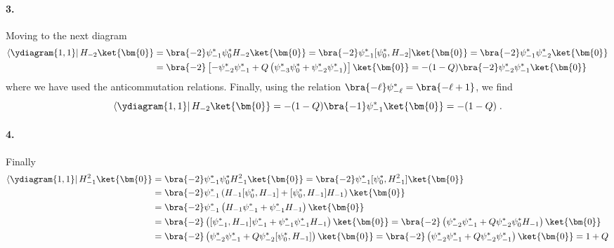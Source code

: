 \paragraph{3.} Moving to the next diagram
\begin{equation}
  \begin{split}
    \left\langle \ydiagram{1,1}\right| H_{-2} \ket{\bm{0}}
    & = \bra{-2} \psi_{-1}^\ast \psi_0^\ast H_{-2} \ket{\bm{0}} =
    \bra{-2} \psi_{-1}^\ast [\psi_0^\ast, H_{-2}] \ket{\bm{0}} =
    \bra{-2} \psi_{-1}^\ast \psi_{-2}^\ast\ket{\bm{0}}\\
    & = \bra{-2} \left[-\psi_{-2}^\ast \psi_{-1}^\ast
      + Q\left( \psi_{-3}^\ast \psi_0^\ast +
      \psi_{-2}^\ast \psi_{-1}^\ast \right)  \right]\ket{\bm{0}}
    = - (1 - Q) \bra{-2} \psi_{-2}^\ast \psi_{-1}^\ast \ket{\bm{0}}\\
  \end{split}
\end{equation}
where we have used the anticommutation relations. Finally, using the relation
\(\bra{-\ell} \psi_{-\ell}^\ast = \bra{-\ell + 1}\), we find
\begin{equation}
    \left\langle \ydiagram{1,1}\right| H_{-2} \ket{\bm{0}}
    = - (1 - Q) \bra{-1} \psi_{-1}^\ast \ket{\bm{0}} = - (1 - Q)\; .
\end{equation}


\paragraph{4.} Finally
\begin{equation}
\begin{split}
\left\langle \ydiagram{1,1}\right| H_{-1}^2 \ket{\bm{0}}
& = \bra{-2} \psi_{-1}^\ast \psi_0^\ast H_{-1}^2 \ket{\bm{0}} =
\bra{-2} \psi_{-1}^\ast [\psi_0^\ast, H_{-1}^2] \ket{\bm{0}} \\
& = \bra{-2} \psi_{-1}^\ast \left( H_{-1}[\psi_0^\ast, H_{-1}] +
    [\psi_0^\ast, H_{-1}] H_{-1}\right) \ket{\bm{0}} \\
& = \bra{-2} \psi_{-1}^\ast \left( H_{-1}\psi_{-1}^\ast + \psi_{-1}^\ast H_{-1}\right) \ket{\bm{0}} \\
& = \bra{-2} \left([\psi_{-1}^\ast, H_{-1}]\psi_{-1}^\ast + \psi_{-1}^\ast \psi_{-1}^\ast H_{-1}\right) \ket{\bm{0}} 
 = \bra{-2} \left(\psi_{-2}^\ast\psi_{-1}^\ast + Q \psi_{-2}^\ast \psi_{0}^\ast H_{-1}\right) \ket{\bm{0}} \\
& = \bra{-2} \left(\psi_{-2}^\ast \psi_{-1}^\ast + Q \psi_{-2}^\ast [\psi_{0}^\ast, H_{-1}]
\right) \ket{\bm{0}}
= \bra{-2} \left(\psi_{-2}^\ast \psi_{-1}^\ast + Q \psi_{-2}^\ast \psi_{-1}^\ast
\right) \ket{\bm{0}} = 1 + Q
\\
\end{split}
\end{equation}

